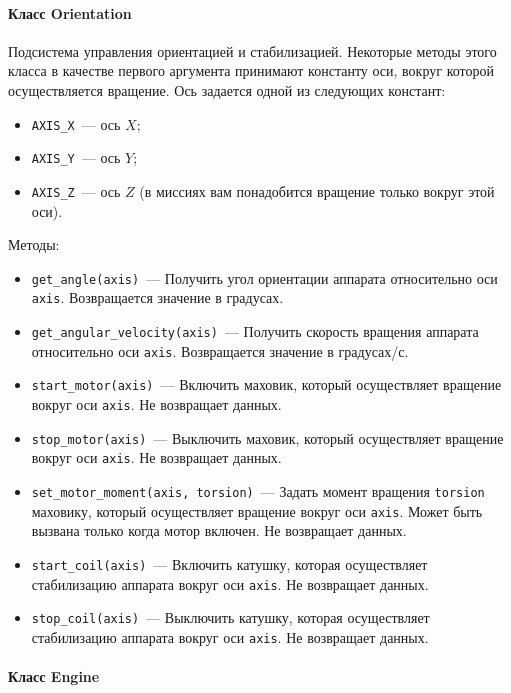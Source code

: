 \documentclass[12pt,a4paper]{article}
\begin{document}
\paragraph{Класс Orientation}

Подсистема управления ориентацией и стабилизацией. Некоторые методы этого класса в
качестве первого аргумента принимают константу оси, вокруг которой осуществляется
вращение. Ось задается одной из следующих констант:

\begin{itemize}
\item \verb'AXIS_X'~--- ось $X$;
\item \verb'AXIS_Y'~--- ось $Y$;
\item \verb'AXIS_Z'~--- ось $Z$ (в миссиях вам понадобится вращение только вокруг этой оси).
\end{itemize}

Методы:
   
\begin{itemize}
\item \verb'get_angle(axis)'~--- Получить угол ориентации аппарата относительно оси
  \verb'axis'. Возвращается значение в градусах.
\item \verb'get_angular_velocity(axis)'~--- Получить скорость вращения аппарата
  относительно оси \verb'axis'. Возвращается значение в градусах/с.
\item \verb'start_motor(axis)'~--- Включить маховик, который осуществляет вращение вокруг
  оси \verb'axis'. Не возвращает данных.
\item \verb'stop_motor(axis)'~--- Выключить маховик, который осуществляет вращение вокруг
  оси \verb'axis'. Не возвращает данных.
\item \verb'set_motor_moment(axis, torsion)'~--- Задать момент вращения \verb'torsion'
  маховику, который осуществляет вращение вокруг оси \verb'axis'. Может быть вызвана только когда
  мотор включен. Не возвращает данных.
\item \verb'start_coil(axis)'~--- Включить катушку, которая осуществляет стабилизацию
  аппарата вокруг оси \verb'axis'. Не возвращает данных.
\item \verb'stop_coil(axis)'~--- Выключить катушку, которая осуществляет стабилизацию
  аппарата вокруг оси \verb'axis'. Не возвращает данных.
\end{itemize}

\paragraph{Класс Engine}
\end{document}
